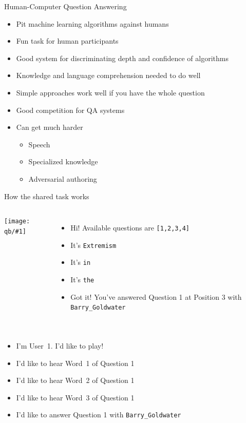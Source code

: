 \documentclass[xcolor=dvipsnames]{beamer}
\newcommand{\gfxq}[2]{
\begin{center}
	\texttt{[image: qb/\#1]}
\end{center}
}
\begin{document}
\begin{frame}{Human-Computer Question Answering}

  \begin{itemize}
    \item Pit machine learning algorithms against humans
    \item Fun task for human participants
    \item Good system for discriminating depth and confidence of
      algorithms
    \item Knowledge and language comprehension needed to do well
    \item Simple approaches work well if you have the whole question
    \item Good competition for QA systems
      \pause
    \item Can get much harder
     \begin{itemize}
       \item Speech
       \item Specialized knowledge
       \item Adversarial authoring
     \end{itemize}
  \end{itemize}

\end{frame}



\begin{frame}{How the shared task works}

\begin{columns}
  \gfxq{bamber}{.5}

  \begin{itemize}
    \item<3-> Hi! Available questions are \texttt{[1,2,3,4]}
    \item<5-> It's \texttt{Extremism}
    \item<7-> It's \texttt{in}
    \item<9-> It's \texttt{the}
    \item<11-> Got it!  You've answered Question 1 at Position
      3 with \texttt{Barry\_Goldwater}
  \end{itemize}

\end{columns}


\begin{columns}

  \begin{itemize}
    \item<2-> I'm User~1.  I’d like to play!
    \item<4-> I’d like to hear Word~1 of Question 1
    \item<6-> I’d like to hear Word~2 of Question 1
    \item<8-> I’d like to hear Word~3 of Question 1
    \item<10-> I’d like to answer Question 1 with
      \texttt{Barry\_Goldwater}
    \end{itemize}
  \only<2->{\gfxq{buzzer}{.5}}
\end{columns}

\end{frame}
\end{document}
